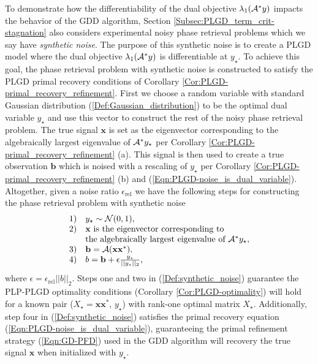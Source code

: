 To demonstrate how the differentiability of the dual objective $\lambda_1({\mathcal A}^*y)$ impacts the behavior of the GDD algorithm, Section \ref{Subsec:PLGD_term_crit-stagnation} also considers experimental noisy phase retrieval problems which we say have \textit{synthetic noise}.
The purpose of this synthetic noise is to create a PLGD model where the dual objective $\lambda_1({\mathcal A}^*y)$ is differentiable at $y_\star$.  
To achieve this goal, the phase retrieval problem with synthetic noise is constructed to satisfy the PLGD primal recovery conditions of Corollary \ref{Cor:PLGD-primal_recovery_refinement}.  First we choose a random variable with standard Gaussian distribution (\ref{Def:Gaussian_distribution}) to be the optimal dual variable $y_\star$ and use this vector to construct the rest of the noisy phase retrieval problem.  The true signal $\mathbf{x}$ is set as the eigenvector corresponding to the algebraically largest eigenvalue of ${\mathcal A}^*y_\star$ per Corollary \ref{Cor:PLGD-primal_recovery_refinement} (a).  This signal is then used to create a true observation $\mathbf{b}$ which is noised with a rescaling of $y_\star$ per Corollary \ref{Cor:PLGD-primal_recovery_refinement} (b) and  (\ref{Eqn:PLGD-noise_is_dual_variable}).  Altogether, given a noise ratio $\epsilon_\text{rel}$ we have the following steps for constructing the phase retrieval problem with synthetic noise
\begin{equation} 			\label{Def:synthetic_noise}
\begin{array}{ll}
1)	&	y_\star \sim {\mathcal N}(0,1), 	\\
2) & \mathbf{x} \text{ is the eigenvector corresponding to } \\
	&	\text{the algebraically largest eigenvalue of } {\mathcal A}^*y_\star, \\
3) & \mathbf{b} = {\mathcal A}(\mathbf{x}\mathbf{x}^*), \\
4) & b = \mathbf{b} + \epsilon \frac{y_\star}{|| y_\star ||_2},
\end{array}
\end{equation}
where $\epsilon = \epsilon_\text{rel}||b||_2$.  
Steps one and two in (\ref{Def:synthetic_noise}) guarantee the PLP-PLGD optimality conditions (Corollary \ref{Cor:PLGD-optimality}) will hold for a known pair ($X_\star = \mathbf{x}\mathbf{x}^*$, $y_\star$) with rank-one optimal matrix $X_\star$.  
Additionally, step four in (\ref{Def:synthetic_noise}) satisfies the primal recovery equation (\ref{Eqn:PLGD-noise_is_dual_variable}), guaranteeing the primal refinement strategy (\ref{Eqn:GD-PFD}) used in the GDD algorithm will recovery the true signal $\mathbf{x}$ when initialized with $y_\star$.
